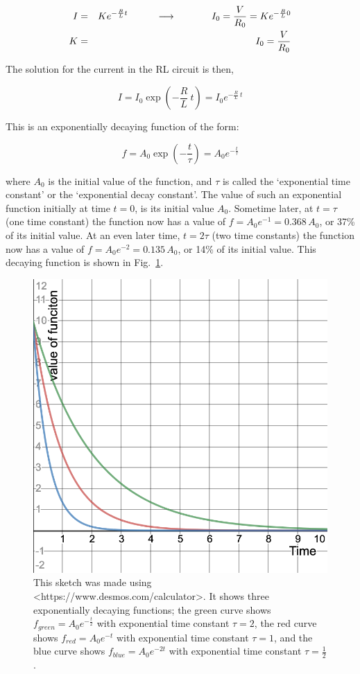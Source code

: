 \documentclass[12pt]{article}
\begin{document}
\begin{flushleft}
\begin{eqnarray*}
 I & = & K e^{-\frac{R}{L}t} \hspace{.4in} \longrightarrow \hspace{.5in}  I_{0} = \frac{V}{R_{0}} = K e^{-\frac{R}{L}0} \nonumber \\
K & = & I_{0} = \frac{V}{R_{0}}
\end{eqnarray*}

The solution for the current in the RL circuit is then,

\begin{equation} 
I = I_{0}\exp{ \left(-\frac{R}{L}\:t \right) }  = I_{0}e^{-\frac{R}{L} \: t}
\label{eq:rl_current}
\end{equation}

This is an exponentially decaying function of the form:

\begin{equation} 
f = A_{0}\exp{ \left(-\frac{t}{\tau}\right) }  = A_{0}e^{-\frac{t}{\tau} }
\label{eq:rl_current}
\end{equation}

where $A_{0}$ is the initial value of the function, and $\tau$ is called the `exponential time constant' or the `exponential decay constant'.   The value of such an exponential function initially at time $t=0$, is its initial value $A_{0}$.  Sometime later, at $t=\tau$ (one time constant) the function now has a value of $f=A_{0}e^{-1}=0.368\, A_{0}$, or 37\% of its initial value.  At an even later time, $t=2\tau$ (two time constants) the function now has a value of $f=A_{0}e^{-2}=0.135\, A_{0}$, or 14\% of its initial value.  This  decaying function is shown in Fig.~\ref{fig:expdecay}.

\vspace{.1in}
\begin{figure}[h]
\centering
\includegraphics*[trim=0cm 0cm 0cm 0cm, clip=true, width=0.5\columnwidth]{expdecay.png}
\caption{\small This sketch was made using \textless https://www.desmos.com/calculator\textgreater.  It shows three exponentially decaying functions; the green curve shows $f_{green}=A_{0}e^{-\frac{t}{2}}$ with exponential time constant $\tau=2$, the red curve shows $f_{red}=A_{0}e^{-t}$ with exponential time constant $\tau=1$, and the blue curve shows $f_{blue}=A_{0}e^{-2t}$ with exponential time constant $\tau=\frac{1}{2}$.}
\label{fig:expdecay}
\end{figure}


\end{flushleft}
\end{document}
